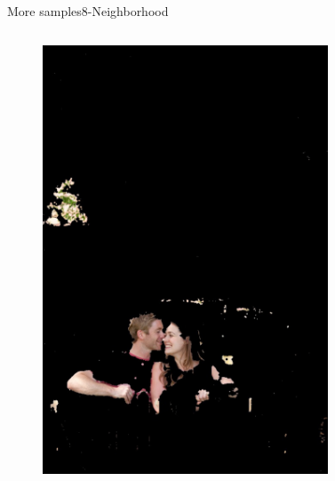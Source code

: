 \documentclass{beamer}
\begin{document}
\begin{frame}{More samples}{8-Neighborhood}
\begin{columns}
\begin{column}{3cm}
\begin{figure}
		\includegraphics[width=0.9\textwidth]{label1500} 
		\end{figure}
\end{column}
\begin{column}{3cm}
	\begin{figure}

\end{figure}
\end{column}
\end{columns}
\end{frame}
\end{document}
